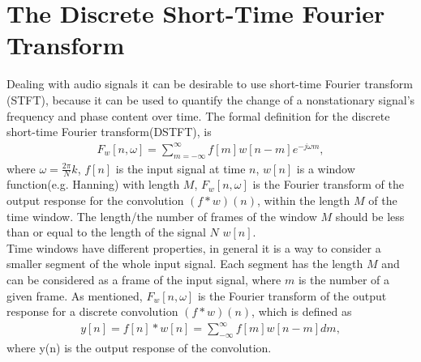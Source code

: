 \section{The Discrete Short-Time Fourier Transform}
Dealing with audio signals it can be desirable to use short-time Fourier transform (STFT), because it can be used to quantify the change of a nonstationary signal's frequency and phase content over time. The formal definition for the discrete short-time Fourier transform(DSTFT), is 
\begin{align*}
    F_w[n,\omega]=\sum^{\infty}_{m=-\infty}f[m]w[n-m]e^{-j\omega m},
\end{align*}
where $\omega=\frac{2\pi}{N} k$, $f[n]$ is the input signal at time $n$, $w[n]$ is a window function(e.g. Hanning) with length $M$, $F_w[n,\omega]$ is the Fourier transform of the output response for the convolution $(f*w)(n)$, within the length $M$ of the time window. The length/the number of frames of the window $M$ should be less than or equal to the length of the signal $N$ $w[n]$\cite[56]{layer2015signal}. 
\\
Time windows have different properties, in general it is a way to consider a smaller segment of the whole input signal. Each segment has the length $M$ and can be considered as a frame of the input signal, where $m$ is the number of a given frame.
As mentioned, $F_w[n,\omega]$ is the Fourier transform of the output response for a discrete convolution $(f*w)(n)$, which is defined as
\begin{align*}
    y[n]=f[n]*w[n]=\sum_{-\infty}^{\infty}f[m]w[n-m]dm,
\end{align*}
where y(n) is the output response of the convolution.


